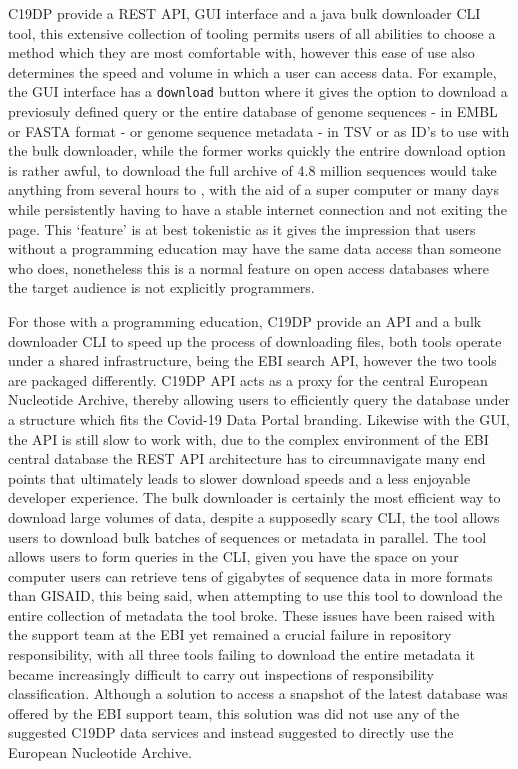 \documentclass{article}
\begin{document}
C19DP provide a REST API, GUI interface and a java bulk downloader CLI
tool, this extensive collection of tooling permits users of all
abilities to choose a method which they are most comfortable with,
however this ease of use also determines the speed and volume in which a
user can access data. For example, the GUI interface has a
\texttt{download} button where it gives the option to download a
previosuly defined query or the entire database of genome sequences - in
EMBL or FASTA format - or genome sequence metadata - in TSV or as ID's
to use with the bulk downloader, while the former works quickly the
entrire download option is rather awful, to download the full archive of
4.8 million sequences would take anything from several hours to , with
the aid of a super computer or many days while persistently having to
have a stable internet connection and not exiting the page. This
`feature' is at best tokenistic as it gives the impression that users
without a programming education may have the same data access than
someone who does, nonetheless this is a normal feature on open access
databases where the target audience is not explicitly programmers.

For those with a programming education, C19DP provide an API and a bulk
downloader CLI to speed up the process of downloading files, both tools
operate under a shared infrastructure, being the EBI search API, however
the two tools are packaged differently. C19DP API acts as a proxy for
the central European Nucleotide Archive, thereby allowing users to
efficiently query the database under a structure which fits the Covid-19
Data Portal branding. Likewise with the GUI, the API is still slow to
work with, due to the complex environment of the EBI central database
the REST API architecture has to circumnavigate many end points that
ultimately leads to slower download speeds and a less enjoyable
developer experience. The bulk downloader is certainly the most
efficient way to download large volumes of data, despite a supposedly
scary CLI, the tool allows users to download bulk batches of sequences
or metadata in parallel. The tool allows users to form queries in the
CLI, given you have the space on your computer users can retrieve tens
of gigabytes of sequence data in more formats than GISAID, this being
said, when attempting to use this tool to download the entire collection
of metadata the tool broke. These issues have been raised with the
support team at the EBI yet remained a crucial failure in repository
responsibility, with all three tools failing to download the entire
metadata it became increasingly difficult to carry out inspections of
responsibility classification. Although a solution to access a snapshot
of the latest database was offered by the EBI support team, this
solution was did not use any of the suggested C19DP data services and
instead suggested to directly use the European Nucleotide Archive.
\end{document}
